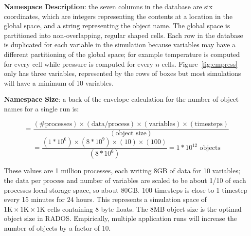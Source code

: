 \textbf{Namespace Description}: the seven columns in the database are six
coordinates, which are integers representing the contents at a location in the
global space, and a string representing the object name. The global space is
partitioned into non-overlapping, regular shaped cells.  Each row in the
database is duplicated for each variable in the simulation because variables
may have a different partitioning of the global space; for example temperature
is computed for every cell while pressure is computed for every \(n\) cells.
Figure~\ref{fig:empress} only has three variables, represented by the rows of
boxes but most simulations will have a minimum of 10 variables.

\textbf{Namespace Size}: a back-of-the-envelope calculation for the number of
object names for a single run is:

\[=\frac
  {(\text{\# processes})\times
   (\text{data/process})\times
   (\text{variables})\times
   (\text{timesteps})}
  {(\text{object size})}
\]
\[=\frac
  {(1*10^6)\times
   (8*10^{9})\times
   (10)\times
   (100)}
   {(8*10^6)}
  = 1*10^{12}
\text{ objects} \]

These values are 1 million processes, each writing 8GB of data for 10
variables; the data per process and number of variables are scaled to be about
1/10 of each processes local storage space, so about 80GB. 100 timesteps is
close to 1 timestep every 15 minutes for 24 hours. This represents a simulation
space of \(1\text{K}\times1\text{K}\times1\text{K}\) cells containing 8 byte
floats.  The 8MB object size is the optimal object size in RADOS.  Empirically,
multiple application runs will increase the number of objects by a factor of
10.

